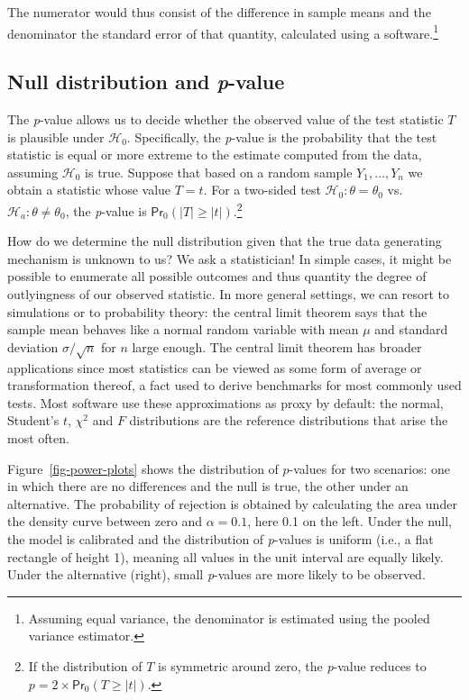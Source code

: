 \documentclass[
  11pt,
  letterpaper,
]{scrbook}
\theoremstyle{definition}
\theoremstyle{definition}
\theoremstyle{remark}
\begin{document}
The numerator would thus consist of the difference in sample means and
the denominator the standard error of that quantity, calculated using a
software.\footnote{Assuming equal variance, the denominator is estimated
  using the pooled variance estimator.}

\subsection{\texorpdfstring{Null distribution and
\emph{p}-value}{Null distribution and p-value}}\label{null-distribution-and-p-value}

The \emph{p}-value allows us to decide whether the observed value of the
test statistic \(T\) is plausible under \(\mathscr{H}_0\). Specifically,
the \emph{p}-value is the probability that the test statistic is equal
or more extreme to the estimate computed from the data, assuming
\(\mathscr{H}_0\) is true. Suppose that based on a random sample
\(Y_1, \ldots, Y_n\) we obtain a statistic whose value \(T=t\). For a
two-sided test \(\mathscr{H}_0:\theta=\theta_0\)
vs.~\(\mathscr{H}_a:\theta \neq \theta_0\), the \emph{p}-value is
\(\mathsf{Pr}_0(|T| \geq |t|)\).\footnote{If the distribution of \(T\)
  is symmetric around zero, the \emph{p}-value reduces to
  \(p = 2 \times \mathsf{Pr}_0(T \geq |t|).\)}

How do we determine the null distribution given that the true data
generating mechanism is unknown to us? We ask a statistician! In simple
cases, it might be possible to enumerate all possible outcomes and thus
quantity the degree of outlyingness of our observed statistic. In more
general settings, we can resort to simulations or to probability theory:
the central limit theorem says that the sample mean behaves like a
normal random variable with mean \(\mu\) and standard deviation
\(\sigma/\sqrt{n}\) for \(n\) large enough. The central limit theorem
has broader applications since most statistics can be viewed as some
form of average or transformation thereof, a fact used to derive
benchmarks for most commonly used tests. Most software use these
approximations as proxy by default: the normal, Student's \(t\),
\(\chi^2\) and \(F\) distributions are the reference distributions that
arise the most often.

Figure~\ref{fig-power-plots} shows the distribution of \(p\)-values for
two scenarios: one in which there are no differences and the null is
true, the other under an alternative. The probability of rejection is
obtained by calculating the area under the density curve between zero
and \(\alpha=0.1\), here 0.1 on the left. Under the null, the model is
calibrated and the distribution of \emph{p}-values is uniform (i.e., a
flat rectangle of height 1), meaning all values in the unit interval are
equally likely. Under the alternative (right), small \emph{p}-values are
more likely to be observed.
\end{document}
